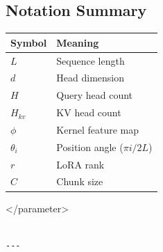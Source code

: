 \subsection{Notation Summary}

\begin{table}[H]
\centering
\small
\begin{tabular}{ll}
\toprule
\textbf{Symbol} & \textbf{Meaning} \\
\midrule
$L$ & Sequence length \\
$d$ & Head dimension \\
$H$ & Query head count \\
$H_{kv}$ & KV head count \\
$\phi$ & Kernel feature map \\
$\theta_i$ & Position angle ($\pi i / 2L$) \\
$r$ & LoRA rank \\
$C$ & Chunk size \\
\bottomrule
\end{tabular}
\end{table}
</parameter>
\begin{lstlisting}

---
\end{lstlisting}